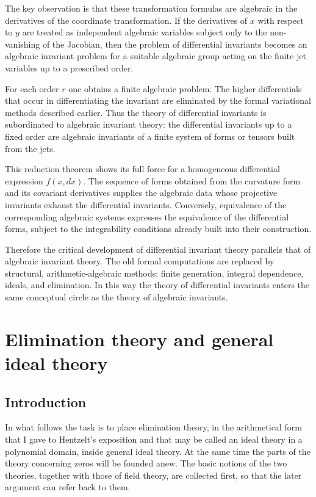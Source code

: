 \documentclass[11pt]{article}
\begin{document}
The key observation is that these transformation formulas are algebraic in the derivatives of the coordinate transformation. If the derivatives of $x$ with respect to $y$ are treated as independent algebraic variables subject only to the non-vanishing of the Jacobian, then the problem of differential invariants becomes an algebraic invariant problem for a suitable algebraic group acting on the finite jet variables up to a prescribed order.

For each order $r$ one obtains a finite algebraic problem. The higher differentials that occur in differentiating the invariant are eliminated by the formal variational methods described earlier. Thus the theory of differential invariants is subordinated to algebraic invariant theory: the differential invariants up to a fixed order are algebraic invariants of a finite system of forms or tensors built from the jets.

This reduction theorem shows its full force for a homogeneous differential expression $f(x,dx)$. The sequence of forms obtained from the curvature form and its covariant derivatives supplies the algebraic data whose projective invariants exhaust the differential invariants. Conversely, equivalence of the corresponding algebraic systems expresses the equivalence of the differential forms, subject to the integrability conditions already built into their construction.

Therefore the critical development of differential invariant theory parallels that of algebraic invariant theory. The old formal computations are replaced by structural, arithmetic-algebraic methods: finite generation, integral dependence, ideals, and elimination. In this way the theory of differential invariants enters the same conceptual circle as the theory of algebraic invariants.

\section{Elimination theory and general ideal theory}

\subsection*{Introduction}

In what follows the task is to place elimination theory, in the arithmetical form that I gave to Hentzelt's exposition and that may be called an ideal theory in a polynomial domain, inside general ideal theory. At the same time the parts of the theory concerning zeros will be founded anew. The basic notions of the two theories, together with those of field theory, are collected first, so that the later argument can refer back to them.
\end{document}
